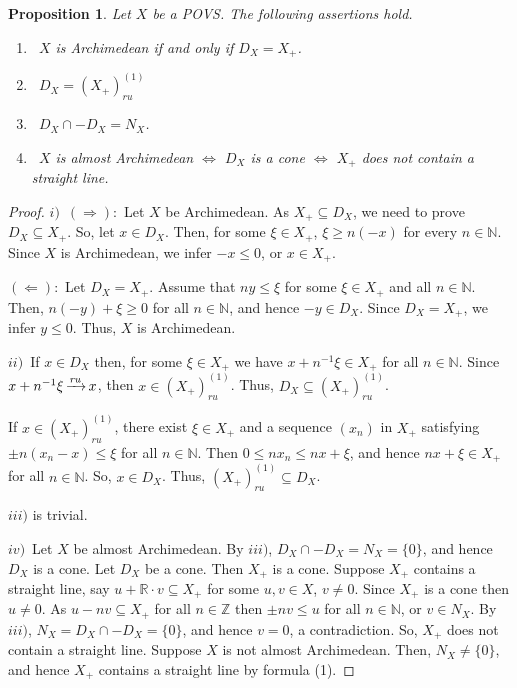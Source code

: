 \documentclass[10pt]{article}
\newtheorem{proposition}{Proposition}[section]
\DeclareMathOperator{\convr}{\xrightarrow[]{{\it ru}}}
\begin{document}
\begin{proposition}\label{Proposition-3_1}
Let $X$ be a POVS. The following assertions hold.
\begin{enumerate}[$i)$]
\item\
$X$ is Archimedean if and only if $D_X=X_+$.
\item\
$D_X=(X_+)^{(1)}_{ru}$
\item\
$D_X\cap-D_X=N_X$.
\item\
$X$ is almost Archimedean $\iff$ $D_X$ is a cone $\iff$ $X_+$ does not contain a straight line.
\end{enumerate}
\end{proposition}

\begin{proof}
$i)$\
$(\Longrightarrow)$:\ 
Let $X$ be Archimedean. As $X_+\subseteq D_X$, we need to prove $D_X\subseteq X_+$.
So, let $x\in D_X$. Then, for some $\xi\in X_+$, $\xi\geqslant n(-x)$ for every $n\in\mathbb{N}$.
Since $X$ is Archimedean, we infer $-x\leqslant 0$, or $x\in X_+$.

\smallskip
$(\Longleftarrow)$:\ 
Let $D_X=X_+$. Assume that $ny\leqslant\xi$ for some $\xi\in X_+$ and all $n\in\mathbb{N}$.
Then, $n(-y)+\xi\geqslant 0$ for all $n\in\mathbb{N}$, and hence $-y\in D_X$. Since $D_X=X_+$,
we infer $y\leqslant 0$. Thus, $X$ is Archimedean.

\medskip
$ii)$\
If $x\in D_X$ then, for some $\xi\in X_+$ we have $x+n^{-1}\xi\in X_+$ for all $n\in\mathbb{N}$. 
Since $x+n^{-1}\xi\convr x$, then $x\in(X_+)^{(1)}_{ru}$. Thus, $D_X\subseteq(X_+)^{(1)}_{ru}$. 

\smallskip
If $x\in (X_+)^{(1)}_{ru}$, there exist $\xi\in X_+$ and a sequence $(x_n)$ in $X_+$ satisfying $\pm n(x_n-x)\leqslant\xi$ for all $n\in\mathbb{N}$. 
Then $0\leqslant nx_n\leqslant nx+\xi$, and hence $nx+\xi\in X_+$ for all $n\in\mathbb{N}$. So, $x\in D_X$.
Thus, $(X_+)^{(1)}_{ru}\subseteq D_X$.

\medskip
$iii)$ is trivial.

\medskip
$iv)$\
Let $X$ be almost Archimedean. By $iii)$, $D_X\cap-D_X=N_X=\{0\}$, and hence $D_X$ is a cone.
Let $D_X$ be a cone. Then $X_+$ is a cone. Suppose $X_+$ contains a straight line, say $u+\mathbb{R}\cdot v\subseteq X_+$ for some $u,v\in X$, $v\ne 0$.
Since $X_+$ is a cone then $u\ne 0$. As $u-nv\subseteq X_+$ for all $n\in\mathbb{Z}$ then $\pm nv\leqslant u$
for all $n\in\mathbb{N}$, or $v\in N_X$. By $iii)$, $N_X=D_X\cap-D_X=\{0\}$, and hence $v=0$, a contradiction. So, $X_+$ does not contain a straight line.
Suppose $X$ is not almost Archimedean. Then, $N_X\ne\{0\}$, and hence $X_+$ contains a straight line by formula (1).
\end{proof}
\end{document}
